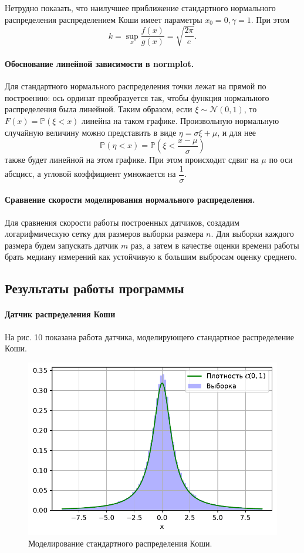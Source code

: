 \documentclass[16pt]{article}
\begin{document}
Нетрудно показать, что наилучшее приближение стандартного нормального распределения распределением Коши имеет параметры $x_0 = 0, \gamma = 1$. При этом
$$k = \sup_x \frac{f(x)}{g(x)} = \sqrt{\dfrac{2\pi}{e}}.$$

\paragraph{Обоснование линейной зависимости в normplot.}
Для стандартного нормального распределения точки лежат на прямой по построению: ось ординат преобразуется так, чтобы функция нормального распределения была линейной. Таким образом, если $\xi \sim \mathcal{N}(0, 1)$, то $F(x) = \mathbb{P}(\xi < x)$ линейна на таком графике. Произвольную нормальную случайную величину можно представить в виде $\eta = \sigma \xi + \mu$, и для нее
$$\mathbb{P}(\eta < x) = \mathbb{P}\left(\xi < \frac{x - \mu}{\sigma}\right)$$
также будет линейной на этом графике. При этом происходит сдвиг на $\mu$ по оси абсцисс, а угловой коэффициент умножается на $\dfrac{1}{\sigma}$.

\paragraph{Сравнение скорости моделирования нормального распределения.} Для сравнения скорости работы построенных датчиков, создадим логарифмическую сетку для размеров выборки размера $n$. Для выборки каждого размера будем запускать датчик $m$ раз, а затем в качестве оценки времени работы брать медиану измерений как устойчивую к большим выбросам оценку среднего.
\subsection{Результаты работы программы}

\paragraph{Датчик распределения Коши} На рис. 10 показана работа датчика, моделирующего стандартное распределение Коши.

\begin{figure}[h]
	\center
	\includegraphics[scale=0.7]{4_1.pdf}
	\caption{Моделирование стандартного распределения Коши.}
\end{figure}
\end{document}
